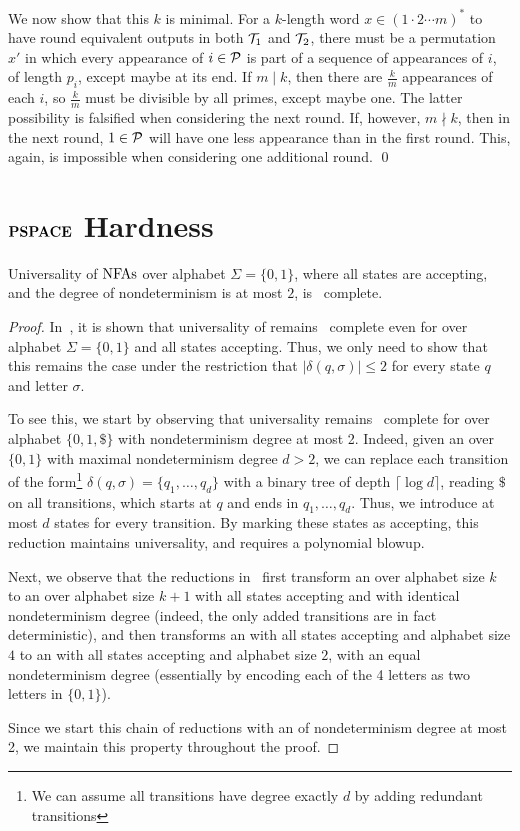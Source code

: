 We now show that this $k$ is minimal.
For a $k$-length word $x\in (1\cdot 2\cdots m)^*$ to have round equivalent outputs in both $\mathcal{T}_1$ and $\mathcal{T}_2$, there must be a permutation $x'$ in which every appearance of $i\in\mathcal{P}$ is part of a sequence of appearances of $i$, of length $p_i$, except maybe at its end. If $m\mid k$, then there are $\frac{k}{m}$ appearances of each $i$, so $\frac{k}{m}$ must be divisible by all primes, except maybe one. The latter possibility is falsified when considering the next round. If, however, $m\nmid k$, then in the next round, $1\in\mathcal{P}$ will have one less appearance than in the first round. This, again, is impossible when considering one additional round.
\qed

\section{$\textbf{PSPACE}$ Hardness}
\label{apx:PSPACE-H}

\begin{lemma}
\label{lem:universalityofnfa}
Universality of $\mbox{\rm NFAs}$ over alphabet $\Sigma=\{0,1\}$, where all states are accepting, and the degree of nondeterminism is at most $2$, is \PSPACE\ complete.
\end{lemma}
\begin{proof}
In~\cite{kao2009nfas}, it is shown that universality of \NFAs remains \PSPACE\ complete even for \NFAs over alphabet $\Sigma=\{0,1\}$ and all states accepting. Thus, we only need to show that this remains the case under the restriction that $|\delta(q,\sigma)|\le 2$ for every state $q$ and letter $\sigma$.

To see this, we start by observing that universality remains \PSPACE\ complete for \NFAs over alphabet $\{0,1,\$\}$ with nondeterminism degree at most 2. Indeed, given an \NFA over $\{0,1\}$ with maximal nondeterminism degree $d>2$, we can replace each transition of the form\footnote{We can assume all transitions have degree exactly $d$ by adding redundant transitions} $\delta(q,\sigma)=\{q_1,\ldots, q_d\}$ with a binary tree of depth $\lceil \log d \rceil$, reading $\$$ on all transitions, which starts at $q$ and ends in $q_1,\ldots,q_d$. Thus, we introduce at most $d$ states for every transition. By marking these states as accepting, this reduction maintains universality, and requires a polynomial blowup.

Next, we observe that the reductions in~\cite[Lemma 2]{kao2009nfas} first transform an \NFA over alphabet size $k$ to an \NFA over alphabet size $k+1$ with all states accepting and with identical nondeterminism degree (indeed, the only added transitions are in fact deterministic), and then transforms an \NFA with all states accepting and alphabet size $4$ to an \NFA with all states accepting and alphabet size $2$, with an equal nondeterminism degree (essentially by encoding each of the 4 letters as two letters in $\{0,1\}$).

Since we start this chain of reductions with an \NFA of nondeterminism degree at most 2, we maintain this property throughout the proof.
\end{proof}

